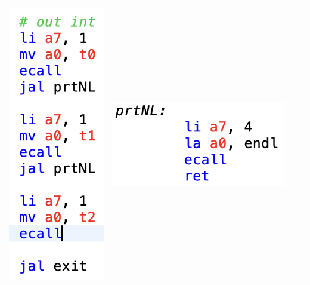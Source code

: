 \documentclass[10pt,a4paper]{article}
\begin{document}
\begin{ans}
\begin{table}[htbp]
\begin{center}
\begin{tabular}{|M{2.5cm}|M{3.5cm}|M{2cm}|M{4cm}|}
            \includegraphics[scale = 0.5]{Lab1-1-3.png} &
            \includegraphics[scale = 0.5]{Lab1-1-4.png} \\
        \hline
    \end{tabular}
    \end{center}
\end{table}


\end{ans}
\end{document}
